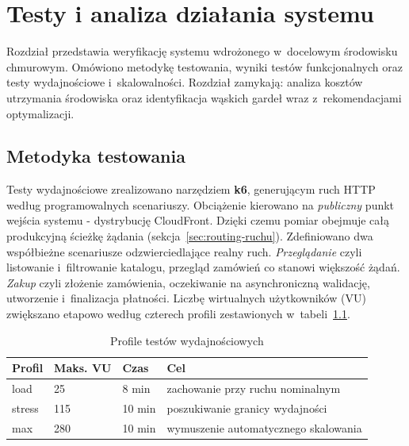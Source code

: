 \chapter{Testy i analiza działania systemu}
\label{chap:testy-i-analiza}

Rozdział przedstawia weryfikację systemu wdrożonego w~docelowym środowisku chmurowym. Omówiono metodykę
testowania, wyniki testów funkcjonalnych oraz testy wydajnościowe i~skalowalności. Rozdział zamykają: analiza kosztów
utrzymania środowiska oraz identyfikacja wąskich gardeł wraz z~rekomendacjami optymalizacji.

\section{Metodyka testowania}
\label{sec:metodyka-testowania}

Testy wydajnościowe zrealizowano narzędziem \textbf{k6}, generującym ruch HTTP według programowalnych scenariuszy.
Obciążenie kierowano na \emph{publiczny} punkt wejścia systemu - dystrybucję CloudFront. Dzięki czemu pomiar
obejmuje całą produkcyjną ścieżkę żądania (sekcja~\ref{sec:routing-ruchu}). Zdefiniowano dwa współbieżne scenariusze odzwierciedlające
realny ruch. \emph{Przeglądanie} czyli listowanie i~filtrowanie katalogu, przegląd zamówień co stanowi większość żądań. 
\emph{Zakup} czyli złożenie zamówienia, oczekiwanie na asynchroniczną walidację, utworzenie i~finalizacja płatności. 
Liczbę wirtualnych użytkowników (VU) zwiększano etapowo według czterech profili zestawionych w~tabeli~\ref{tab:profile-testowe}.

\begin{table}[H]
    \centering
    \caption{Profile testów wydajnościowych}
    \label{tab:profile-testowe}
    \begin{tabular}{lllp{6.2cm}}
        \toprule
        \textbf{Profil} & \textbf{Maks. VU} & \textbf{Czas} & \textbf{Cel} \\
        \midrule
        load   & 25  & 8 min  & zachowanie przy ruchu nominalnym \\
        stress & 115 & 10 min & poszukiwanie granicy wydajności \\
        max    & 280 & 10 min & wymuszenie automatycznego skalowania \\
        \bottomrule
    \end{tabular}
\end{table}

